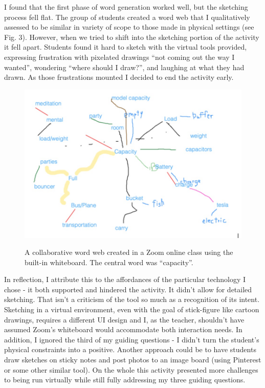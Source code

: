 \documentclass[journal]{vgtc}                %
\begin{document}
I found that the first phase of word generation worked well, but the sketching process fell flat. The group of students created a word web that I qualitatively assessed to be similar in variety of scope to those made in physical settings (see Fig. 3).  However, when we tried to shift into the sketching portion of the activity it fell apart. Students found it hard to sketch with the virtual tools provided, expressing frustration with pixelated drawings “not coming out the way I wanted”, wondering “where should I draw?”, and laughing at what they had drawn. As those frustrations mounted I decided to end the activity early. 

\begin{figure}[h]
  \centering
  \includegraphics[scale=0.26]{figures/figure3.jpg}
  \label{fig:online_word_web}
  \caption{A collaborative word web created in a Zoom online class using the built-in whiteboard. The central word was “capacity”.}
\end{figure}

In reflection, I attribute this to the affordances of the particular technology I chose - it both supported and hindered the activity. It didn't allow for detailed sketching. That isn’t a criticism of the tool so much as a recognition of its intent. Sketching in a virtual environment, even with the goal of stick-figure like cartoon drawings, requires a different UI design and I, as the teacher, shouldn’t have assumed Zoom’s whiteboard would accommodate both interaction needs. In addition, I ignored the third of my guiding questions - I didn't turn the student's physical constraints into a positive. Another approach could be to have students draw sketches on sticky notes and post photos to an image board (using Pinterest or some other similar tool). On the whole this activity presented more challenges to being run virtually while still fully addressing my three guiding questions.
\end{document}

